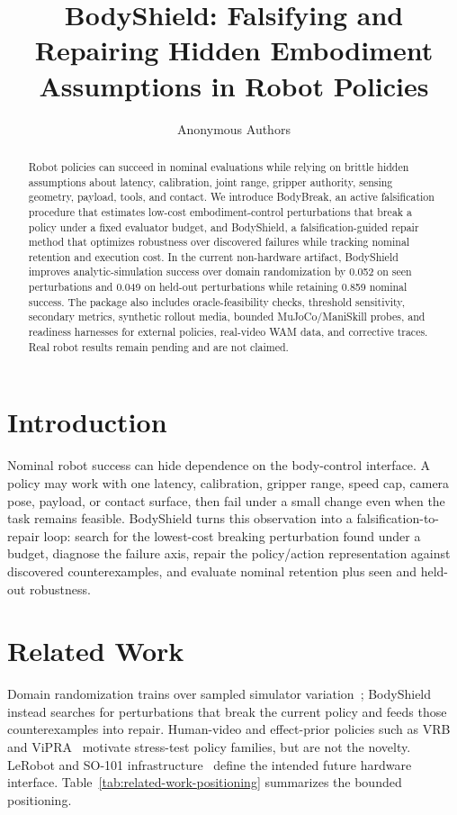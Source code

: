 \documentclass[10pt,conference]{IEEEtran}
\title{BodyShield: Falsifying and Repairing Hidden Embodiment Assumptions in Robot Policies}
\author{Anonymous Authors}
\begin{document}
\maketitle

\begin{abstract}
Robot policies can succeed in nominal evaluations while relying on brittle hidden assumptions about latency, calibration, joint range, gripper authority, sensing geometry, payload, tools, and contact. We introduce BodyBreak, an active falsification procedure that estimates low-cost embodiment-control perturbations that break a policy under a fixed evaluator budget, and BodyShield, a falsification-guided repair method that optimizes robustness over discovered failures while tracking nominal retention and execution cost. In the current non-hardware artifact, BodyShield improves analytic-simulation success over domain randomization by 0.052 on seen perturbations and 0.049 on held-out perturbations while retaining 0.859 nominal success. The package also includes oracle-feasibility checks, threshold sensitivity, secondary metrics, synthetic rollout media, bounded MuJoCo/ManiSkill probes, and readiness harnesses for external policies, real-video WAM data, and corrective traces. Real robot results remain pending and are not claimed.
\end{abstract}

\section{Introduction}
Nominal robot success can hide dependence on the body-control interface. A policy may work with one latency, calibration, gripper range, speed cap, camera pose, payload, or contact surface, then fail under a small change even when the task remains feasible. BodyShield turns this observation into a falsification-to-repair loop: search for the lowest-cost breaking perturbation found under a budget, diagnose the failure axis, repair the policy/action representation against discovered counterexamples, and evaluate nominal retention plus seen and held-out robustness.

\section{Related Work}
Domain randomization trains over sampled simulator variation~\cite{chen2022domainrandomization,vuong2019pickdr,muratore2022randomizedsim}; BodyShield instead searches for perturbations that break the current policy and feeds those counterexamples into repair. Human-video and effect-prior policies such as VRB~\cite{bahl2023vrb} and ViPRA~\cite{routray2025vipra} motivate stress-test policy families, but are not the novelty. LeRobot and SO-101 infrastructure~\cite{cadene2024lerobot} define the intended future hardware interface. Table~\ref{tab:related-work-positioning} summarizes the bounded positioning.
\end{document}

